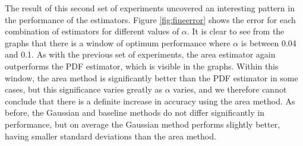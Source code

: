 \documentclass[a4paper,11pt]{article}
\begin{document}
The result of this second set of experiments uncovered an interesting pattern in
the performance of the estimators. Figure \ref{fig:fineerror} shows the error
for each combination of estimators for different values of $\alpha$. It is clear
to see from the graphs that there is a window of optimum performance where
$\alpha$ is between 0.04 and 0.1. As with the previous set of experiments, the
area estimator again outperforms the PDF estimator, which is visible in the
graphs. Within this window, the area method is significantly better than the PDF
estimator in some cases, but this significance varies greatly as $\alpha$
varies, and we therefore cannot conclude that there is a definite increase in
accuracy using the area method. As before, the Gaussian and baseline methods do
not differ significantly in performance, but on average the Gaussian method
performs slightly better, having smaller standard deviations than the area
method.
\end{document}
